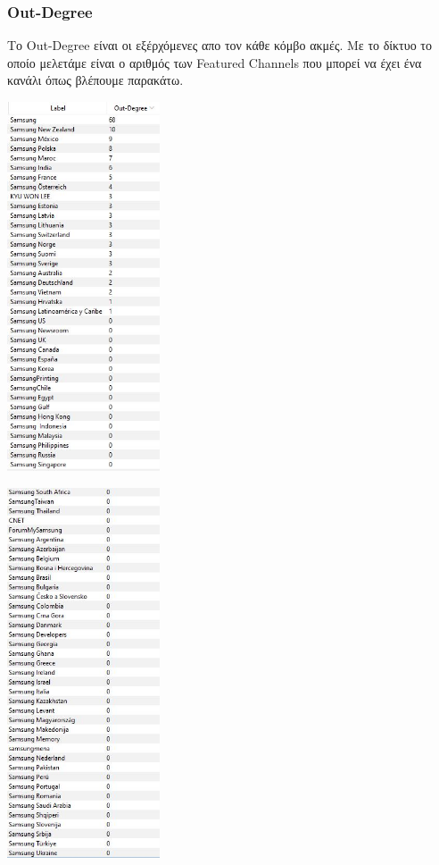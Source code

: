 \documentclass[12pt]{article}
\begin{document}
	\subsubsection{Out-Degree} %
	Το Out-Degree είναι οι εξέρχόμενες απο τον κάθε κόμβο ακμές. Με το δίκτυο το οποίο μελετάμε είναι ο αριθμός των Featured Channels που μπορεί να έχει ένα κανάλι όπως βλέπουμε παρακάτω.
	\begin{center}
		\begin{adjustbox}{valign=t}
			\includegraphics[width=0.34\textwidth]{photos-files/section6/out-degree1.JPG}
		\end{adjustbox}
		\hfill
		\begin{adjustbox}{valign=t}
			\includegraphics[width=0.34\textwidth]{photos-files/section6/out-degree2.JPG}
		\end{adjustbox}
	\end{center}
\end{document}
